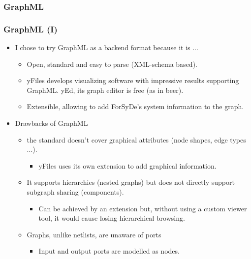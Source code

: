 \documentclass{beamer}
\begin{document}
\subsubsection{GraphML}
\begin{frame}
  \frametitle{GraphML (I)}
  \begin{itemize}
  \item I chose to try GraphML as a backend format because it is ...
    \begin{itemize}
    \item Open, standard and easy to parse (XML-schema based).
    \item yFiles develops visualizing software
      with impressive results supporting GraphML. 
      yEd, its graph editor is free (as in beer). 
    \item Extensible, allowing to add ForSyDe's system information to
      the graph.
    \end{itemize}
  \item Drawbacks of GraphML
    \begin{itemize}
    \item the standard doesn't cover graphical attributes (node shapes, edge types ...).
      \begin{itemize}
      \item yFiles uses its own extension to add graphical information.
      \end{itemize}
    \item It supports hierarchies (nested graphs) but does not
      directly support subgraph sharing (components).
      \begin{itemize}
      \item Can be achieved by an extension but, without using a
        custom viewer tool, it would cause losing hierarchical
        browsing.
      \end{itemize}
    \item Graphs, unlike netlists, are unaware of ports
      \begin{itemize}
        \item Input and output ports are modelled as nodes.
      \end{itemize}
    \end{itemize}
  \end{itemize}
\end{frame}
\end{document}
